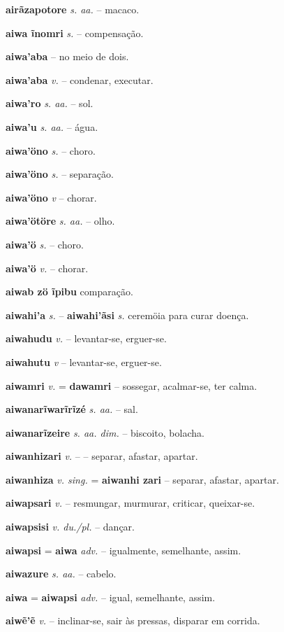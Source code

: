 \textbf{airãzapotore} \textit{s. aa.} -- macaco.

\textbf{aiwa ĩnomri} \textit{s.} -- compensação.

\textbf{aiwa'aba} -- no meio de dois.

\textbf{aiwa'aba} \textit{v.} -- condenar, executar.

\textbf{aiwa'ro} \textit{s. aa.} -- sol.

\textbf{aiwa'u} \textit{s. aa.} -- água.

\textbf{aiwa'öno} \textit{s.} -- choro.

\textbf{aiwa'öno} \textit{s.} -- separação.

\textbf{aiwa'öno} \textit{v} -- chorar.

\textbf{aiwa'ötöre} \textit{s. aa.} -- olho.

\textbf{aiwa'ö} \textit{s.} -- choro.

\textbf{aiwa'ö} \textit{v.} -- chorar.

\textbf{aiwab zö ĩpibu} comparação.

\textbf{aiwahi'a} \textit{s.} -- \textbf{aiwahi'ãsi} \textit{s.} ceremöia para curar doença.

\textbf{aiwahudu} \textit{v.} -- levantar-se, erguer-se.

\textbf{aiwahutu} \textit{v} -- levantar-se, erguer-se.

\textbf{aiwamri} \textit{v.} = \textbf{dawamri} -- sossegar, acalmar-se, ter calma.

\textbf{aiwanarĩwarĩrĩzé} \textit{s. aa.} -- sal.

\textbf{aiwanarĩzeire} \textit{s. aa. dim.} -- biscoito, bolacha.

\textbf{aiwanhizari} \textit{v.} -- -- separar, afastar, apartar.

\textbf{aiwanhiza} \textit{v. sing.} = \textbf{aiwanhi zari} -- separar, afastar, apartar.

\textbf{aiwapsari} \textit{v.} -- resmungar, murmurar, criticar, queixar-se.

\textbf{aiwapsisi} \textit{v. du./pl.} -- dançar.

\textbf{aiwapsi} = \textbf{aiwa} \textit{adv.} -- igualmente, semelhante, assim.

\textbf{aiwazure} \textit{s. aa.} -- cabelo.

\textbf{aiwa} = \textbf{aiwapsi} \textit{adv.} -- igual, semelhante, assim.

\textbf{aiwẽ'ẽ} \textit{v.} -- inclinar-se, sair às pressas, disparar em corrida.

